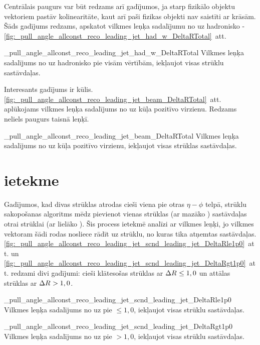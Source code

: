 Centrālais paugurs var būt redzams arī gadījumos, ja starp fizikālo objektu vektoriem pastāv kolinearitāte, kaut arī paši fizikas objekti nav saistīti ar krāsām. Šāds gadījums redzams, apskatot vilkmes leņķa sadalījumu no \leadingjet uz hadronisko \PW - \ref{fig:_pull_angle_allconst_reco_leading_jet_had_w_DeltaRTotal}~att. 

          {_pull_angle_allconst_reco_leading_jet_had_w_DeltaRTotal}
          {Vilkmes leņķa sadalījums no \leadingjet uz hadronisko \PW pie visām \DeltaR vērtībām, iekļaujot visas strūklu sastāvdaļas.}

Interesants gadījums ir kūlis. \ref{fig:_pull_angle_allconst_reco_leading_jet_beam_DeltaRTotal}~att. aplūkojams vilkmes leņķa sadalījums no \leadingjet uz kūļa pozitīvo virzienu. Redzams neliels paugurs taisnā leņķī.

          {_pull_angle_allconst_reco_leading_jet_beam_DeltaRTotal}
          {Vilkmes leņķa sadalījums no \leadingjet uz kūļa pozitīvo virzienu, iekļaujot visas strūklas sastāvdaļas.}

\section{\DeltaR ietekme}

Gadījumos, kad divas strūklas atrodas cieši viena pie otras $\eta-\phi$ telpā, strūklu sakopošanas algoritms mēdz pievienot vienas strūklas (ar mazāko \pt) sastāvdaļas otrai strūklai (ar lielāko \pt). Šis process ietekmē analīzi ar vilkmes leņķi, jo vilkmes vektoram šādi rodas nosliece rādīt uz strūklu, no kuras tika atņemtas sastāvdaļas. \ref{fig:_pull_angle_allconst_reco_leading_jet_scnd_leading_jet_DeltaRle1p0}~att. un \ref{fig:_pull_angle_allconst_reco_leading_jet_scnd_leading_jet_DeltaRgt1p0}~att. redzami divi gadījumi: cieši klātesošas strūklas ar $\Delta R^{}\leq1,0$ un attālas strūklas ar $\Delta R^{}>1,0$.

          {_pull_angle_allconst_reco_leading_jet_scnd_leading_jet_DeltaRle1p0}
          {Vilkmes leņķa sadalījums no \leadingjet uz \scndleadingjet pie \DeltaR$\leq1,0$, iekļaujot visas strūklu sastāvdaļas.}

          {_pull_angle_allconst_reco_leading_jet_scnd_leading_jet_DeltaRgt1p0}
          {Vilkmes leņķa sadalījums no \leadingjet uz \scndleadingjet pie \DeltaR$>1,0$, iekļaujot visas strūklu sastāvdaļas.}


